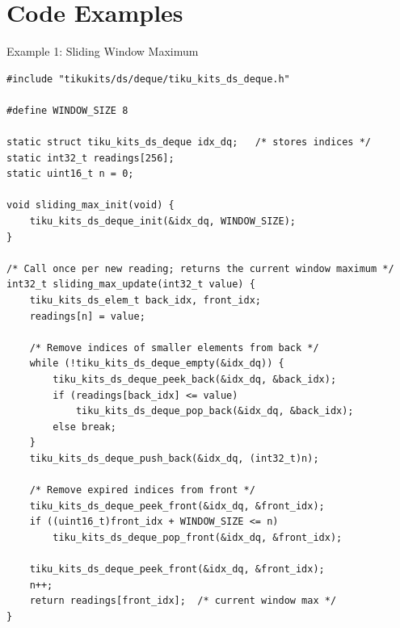 \documentclass[aspectratio=169, 10pt]{beamer}
\begin{document}
\section{Code Examples}

\begin{frame}[fragile]{Example 1: Sliding Window Maximum}
\begin{lstlisting}[style=cstyle,
  title={Maintain the maximum over the last W sensor readings}]
#include "tikukits/ds/deque/tiku_kits_ds_deque.h"

#define WINDOW_SIZE 8

static struct tiku_kits_ds_deque idx_dq;   /* stores indices */
static int32_t readings[256];
static uint16_t n = 0;

void sliding_max_init(void) {
    tiku_kits_ds_deque_init(&idx_dq, WINDOW_SIZE);
}

/* Call once per new reading; returns the current window maximum */
int32_t sliding_max_update(int32_t value) {
    tiku_kits_ds_elem_t back_idx, front_idx;
    readings[n] = value;

    /* Remove indices of smaller elements from back */
    while (!tiku_kits_ds_deque_empty(&idx_dq)) {
        tiku_kits_ds_deque_peek_back(&idx_dq, &back_idx);
        if (readings[back_idx] <= value)
            tiku_kits_ds_deque_pop_back(&idx_dq, &back_idx);
        else break;
    }
    tiku_kits_ds_deque_push_back(&idx_dq, (int32_t)n);

    /* Remove expired indices from front */
    tiku_kits_ds_deque_peek_front(&idx_dq, &front_idx);
    if ((uint16_t)front_idx + WINDOW_SIZE <= n)
        tiku_kits_ds_deque_pop_front(&idx_dq, &front_idx);

    tiku_kits_ds_deque_peek_front(&idx_dq, &front_idx);
    n++;
    return readings[front_idx];  /* current window max */
}
\end{lstlisting}
\end{frame}
\end{document}
